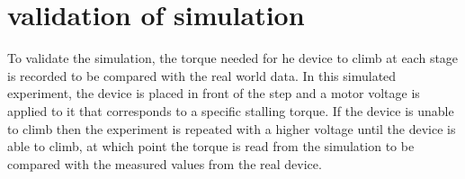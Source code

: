 \section{validation of simulation}
To validate the simulation, the torque needed for he device to climb at each stage is recorded to be compared with the real world data. In this simulated experiment, the device is placed in front of the step and a motor voltage is applied to it that corresponds to a specific stalling torque. If the device is unable to climb then the experiment is repeated with a higher voltage until the device is able to climb, at which point the torque is read from the simulation to be compared with the measured values from the real device.